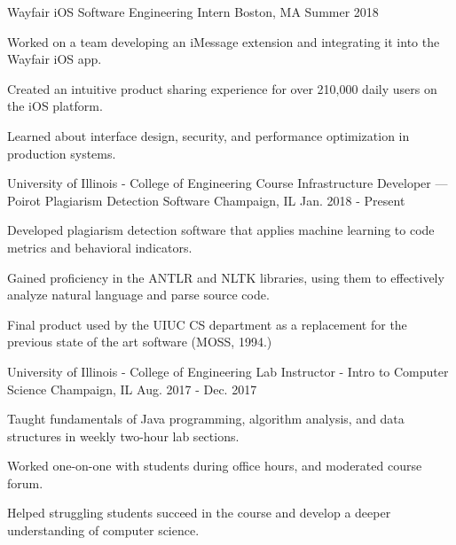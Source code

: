 
\begin{cventries}
\cventry
{Wayfair} %
{iOS Software Engineering Intern} %
{Boston, MA} %
{Summer 2018} %
{
	\begin{cvitems} %
		\item {Worked on a team developing an iMessage extension and integrating it into the Wayfair iOS app.}
		\item {Created an intuitive product sharing experience for over 210,000 daily users on the iOS platform.}
		\item {Learned about interface design, security, and performance optimization in production systems.}
	\end{cvitems}
}
\cventry
{University of Illinois - College of Engineering} %
{Course Infrastructure Developer — Poirot Plagiarism Detection Software} %
{Champaign, IL} %
{Jan. 2018 - Present} %
{
    \begin{cvitems} %
        \item {Developed plagiarism detection software that applies machine learning to code metrics and behavioral indicators.}
        \item {Gained proficiency in the ANTLR and NLTK libraries, using them to effectively analyze natural language and parse source code.}
       \item {Final product used by the UIUC CS department as a replacement for the previous state of the art software (MOSS, 1994.)}
    \end{cvitems}
}
\cventry
{University of Illinois - College of Engineering} %
{Lab Instructor - Intro to Computer Science} %
{Champaign, IL} %
{Aug. 2017 - Dec. 2017} %
{
	\begin{cvitems} %
		\item {Taught fundamentals of Java programming, algorithm analysis, and data structures in weekly two-hour lab sections.}
		\item {Worked one-on-one with students during office hours, and moderated course forum.}
		\item {Helped struggling students succeed in the course and develop a deeper understanding of computer science.}
	\end{cvitems}
}
\end{cventries}
